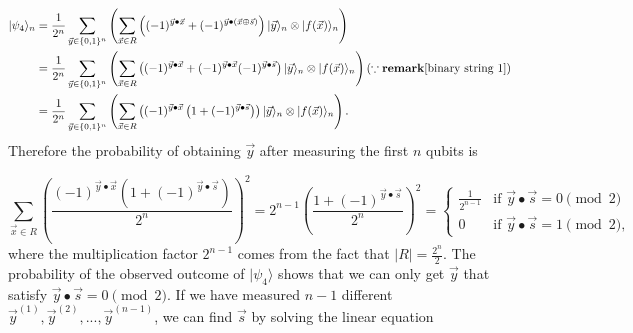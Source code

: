 \begin{equation}
\begin{aligned}
|\psi_4\rangle_n 
& =\frac{1}{2^{n}} \sum_{\vec{y} \in \{0,1\}^n}\left(\sum_{\vec{x} \in R} \left((-1)^{\vec{y} \bullet \vec{x}} +(-1)^{\vec{y} \bullet(\vec{x} \oplus \vec{s})}\right)|\vec{y}\rangle_n \otimes |f(\vec{x})\rangle_n\right) \\
& = \frac{1}{2^n} \sum_{\vec{y} \in \{0,1\}^n} \left( \sum_{\vec{x} \in R} \left((-1)^{\vec{y} \bullet \vec{x}} + (-1)^{\vec{y} \bullet \vec{x}} (-1)^{\vec{y} \bullet \vec{s}}\right) |\vec{y}\rangle_n \otimes |f(\vec{x})\rangle_n \right)(\because \mathbf{remark} \ref{binary string 1})\\
& = \frac{1}{2^n} \sum_{\vec{y} \in \{0,1\}^n}\left(\sum_{\vec{x} \in R} \left((-1)^{\vec{y} \bullet \vec{x}}\left(1+(-1)^{\vec{y} \bullet \vec{s}}\right)\right)|\vec{y}\rangle_n \otimes|f(\vec{x})\rangle_n\right).
\end{aligned}
\end{equation}
Therefore the probability of obtaining $\vec{y}$ after measuring the first $n$ qubits is

\begin{equation}
    \sum_{\vec{x} \in R}\left(\frac{(-1)^{\vec{y} \bullet \vec{x}}\left(1+(-1)^{\vec{y} \bullet \vec{s}}\right)}{2^n}\right)^2=2^{n-1}\left(\frac{1+(-1)^{\vec{y} \bullet \vec{s}}}{2^n}\right)^2=
\begin{cases}
\frac{1}{2^{n-1}} & \text{if } \vec{y} \bullet \vec{s} = 0 \pmod{2} \\
0 & \text{if } \vec{y} \bullet \vec{s} = 1 \pmod{2},
\end{cases}
\end{equation}
where the multiplication factor $2^{n-1}$ comes from the fact that $|R|=\frac{2^n}{2}$. The probability of the observed outcome of $|\psi_4\rangle$ shows that we can only get $\vec{y}$ that satisfy $\vec{y} \bullet \vec{s} = 0 \pmod{2}$. If we have measured $n-1$ different $\vec{y}^{(1)}, \vec{y}^{(2)},..., \vec{y}^{(n-1)}$, we can find $\vec{s}$ by solving the linear equation 

